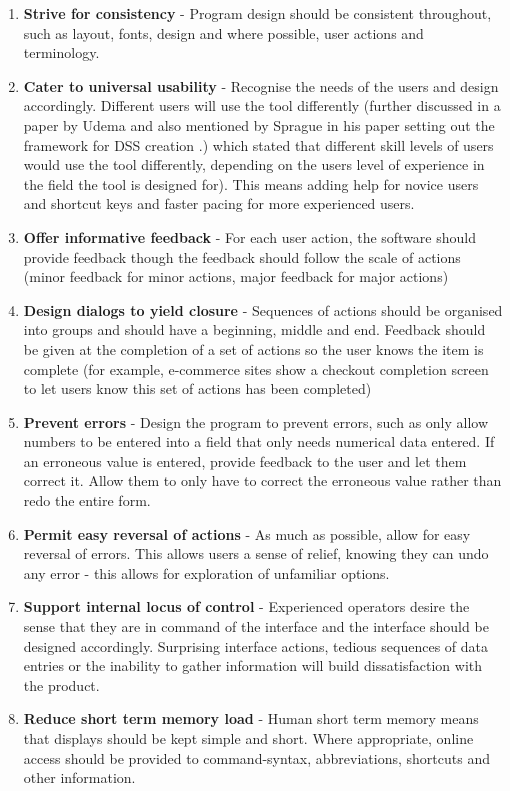 \documentclass[table,a4paper,oneside]{book}
\begin{document}
\begin{enumerate}
\item \textbf{Strive for consistency} - Program design should be consistent throughout, such as layout, fonts, design and where possible, user actions and terminology.

\item \textbf{Cater to universal usability} - Recognise the needs of the users and design accordingly. Different users will use the tool differently (further discussed in a paper by Udema \citep{Uduma2007} and also mentioned by Sprague in his paper setting out the framework for \ac{DSS} creation \citep{Sprague1980}.) which stated that different skill levels of users would use the tool differently, depending on the users level of experience in the field the tool is designed for). This means adding help for novice users and shortcut keys and faster pacing for more experienced users.

\item \textbf{Offer informative feedback} - For each user action, the software should provide feedback though the feedback should follow the scale of actions (minor feedback for minor actions, major feedback for major actions)

\item \textbf{Design dialogs to yield closure} - Sequences of actions should be organised into groups and should have a beginning, middle and end. Feedback should be given at the completion of a set of actions so the user knows the item is complete (for example, e-commerce sites show a checkout completion screen to let users know this set of actions has been completed)

\item \textbf{Prevent errors} - Design the program to prevent errors, such as only allow numbers to be entered into a field that only needs numerical data entered. If an erroneous value is entered, provide feedback to the user and let them correct it. Allow them to only have to correct the erroneous value rather than redo the entire form.

\item \textbf{Permit easy reversal of actions} - As much as possible, allow for easy reversal of errors. This allows users a sense of relief, knowing they can undo any error - this allows for exploration of unfamiliar options.

\item \textbf{Support internal locus of control} - Experienced operators desire the sense that they are in command of the interface and the interface should be designed accordingly. Surprising interface actions, tedious sequences of data entries or the inability to gather information will build dissatisfaction with the product.

\item \textbf{Reduce short term memory load} - Human short term memory means that displays should be kept simple and short. Where appropriate, online access should be provided to command-syntax, abbreviations, shortcuts and other information.
\end{enumerate}





\end{document}
